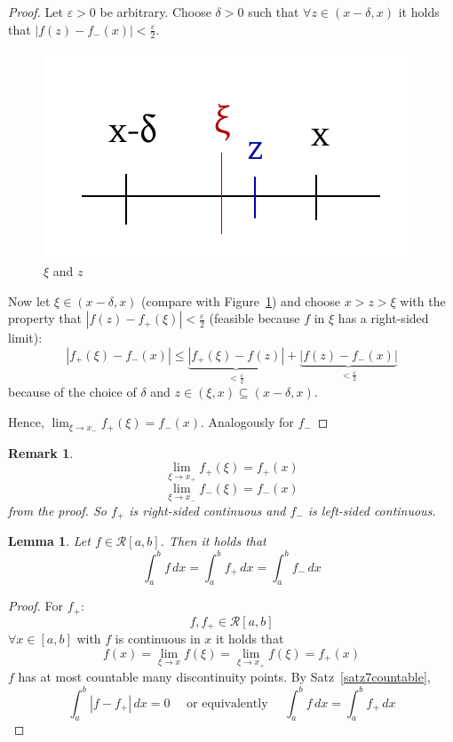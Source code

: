 \documentclass{article}
\newtheorem{lemma}{Lemma}  \numberwithin{lemma}{section}
\newtheorem{remark}{Remark}  \numberwithin{remark}{section}
\newcommand{\card}[1]{\left|#1\right|}
\begin{document}
\begin{proof}
  Let $\varepsilon > 0$ be arbitrary. Choose $\delta > 0$ such that $\forall z \in (x - \delta, x)$ it holds that $\card{f(z) - f_-(x)} < \frac\varepsilon2$.

  \begin{figure}[t]
    \begin{center}
      \includegraphics{img/21_xi_z.pdf}
      \caption{$\xi$ and $z$}
      \label{img:xiz}
    \end{center}
  \end{figure}

  Now let $\xi \in (x - \delta, x)$ (compare with Figure~\ref{img:xiz}) and choose $x > z > \xi$ with the property that $\card{f(z) - f_+(\xi)} < \frac\varepsilon2$ (feasible because $f$ in $\xi$ has a right-sided limit):
  \[
    \card{f_+(\xi) - f_-(x)}
    \leq \underbrace{\card{f_+(\xi) - f(z)}}_{< \frac\varepsilon2} + \underbrace{\card{f(z) - f_-(x)}}_{< \frac\varepsilon2}
  \]
  because of the choice of $\delta$ and $z \in (\xi, x) \subseteq (x - \delta, x)$.

  Hence, $\lim_{\xi \to x_-} f_+(\xi) = f_-(x)$. Analogously for $f_-$
\end{proof}

\begin{remark}
  \[ \lim_{\xi \to x_+} f_+(\xi) = f_+(x) \]
  \[ \lim_{\xi \to x_-} f_-(\xi) = f_-(x) \]
  from the proof. So $f_+$ is right-sided continuous and $f_-$ is left-sided continuous.
\end{remark}

\begin{lemma} %
  Let $f \in \mathcal R[a,b]$. Then it holds that
  \[ \int_a^b f \, dx = \int_a^b f_+ \, dx = \int_a^b f_- \, dx \]
\end{lemma}

\begin{proof}
  For $f_+$:
  \[ f, f_+ \in \mathcal R[a,b] \]
  $\forall x \in [a,b]$ with $f$ is continuous in $x$ it holds that
  \[ f(x) = \lim_{\xi\to x} f(\xi) = \lim_{\xi\to x_+} f(\xi) = f_+(x) \]
  $f$ has at most countable many discontinuity points. By Satz~\ref{satz7countable},
  \[
    \int_a^b \card{f - f_+} \, dx = 0
    \quad \text{ or equivalently } \quad
    \int_a^b f \, dx = \int_a^b f_+ \, dx
  \]
\end{proof}
\end{document}
